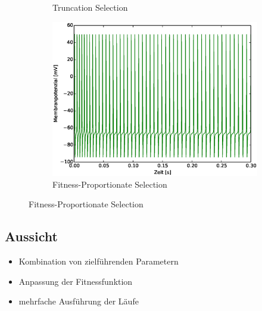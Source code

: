 \begin{frame}
\begin{figure}
\begin{subfigure}{.5\textwidth}
      \caption*{Truncation Selection}
    \end{subfigure}%
    \begin{subfigure}{.5\textwidth}
      \centering
      \includegraphics*[viewport=19 10 532 394,width=0.7\linewidth]{genetic/fs-fitn-prop.eps}
      \caption*{Fitness-Proportionate Selection}
    \end{subfigure}
  \end{figure}
\end{frame}

\subsection{Aussicht}

\begin{frame}
  \begin{itemize}
  \item Kombination von zielführenden Parametern
  \item Anpassung der Fitnessfunktion
  \item mehrfache Ausführung der Läufe
  \end{itemize}
\end{frame}